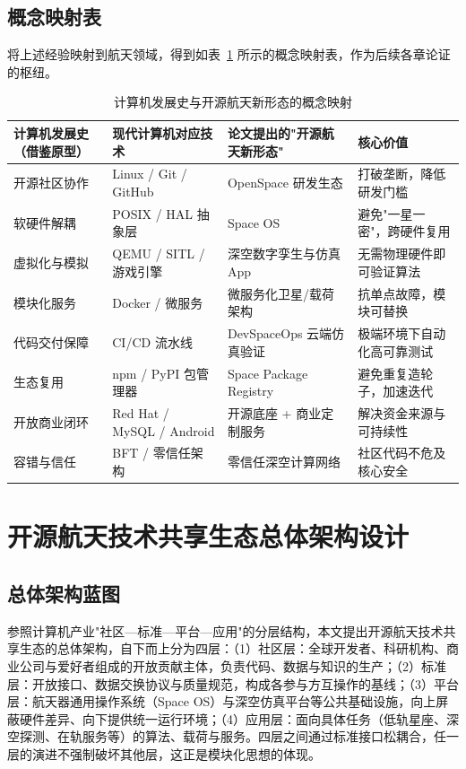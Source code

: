 \documentclass[UTF8,a4paper,zihao=-4]{ctexart}
\begin{document}
\subsection{概念映射表}
将上述经验映射到航天领域，得到如表~\ref{tab:mapping} 所示的概念映射表，作为后续各章论证的枢纽。

\begin{table}[htbp]
\centering
\footnotesize
\caption{计算机发展史与开源航天新形态的概念映射}
\label{tab:mapping}
\begin{tabularx}{\textwidth}{@{}>{\raggedright\arraybackslash}p{2.8cm}>{\raggedright\arraybackslash}p{2.8cm}>{\raggedright\arraybackslash}p{2.8cm}>{\raggedright\arraybackslash}p{2.8cm}@{}}
\toprule
计算机发展史（借鉴原型） & 现代计算机对应技术 & 论文提出的"开源航天新形态" & 核心价值 \\
\midrule
开源社区协作 & Linux / Git / GitHub & OpenSpace 研发生态 & 打破垄断，降低研发门槛 \\
软硬件解耦 & POSIX / HAL 抽象层 & Space OS & 避免"一星一密"，跨硬件复用 \\
虚拟化与模拟 & QEMU / SITL / 游戏引擎 & 深空数字孪生与仿真 App & 无需物理硬件即可验证算法 \\
模块化服务 & Docker / 微服务 & 微服务化卫星/载荷架构 & 抗单点故障，模块可替换 \\
代码交付保障 & CI/CD 流水线 & DevSpaceOps 云端仿真验证 & 极端环境下自动化高可靠测试 \\
生态复用 & npm / PyPI 包管理器 & Space Package Registry & 避免重复造轮子，加速迭代 \\
开放商业闭环 & Red Hat / MySQL / Android & 开源底座 + 商业定制服务 & 解决资金来源与可持续性 \\
容错与信任 & BFT / 零信任架构 & 零信任深空计算网络 & 社区代码不危及核心安全 \\
\bottomrule
\end{tabularx}
\end{table}

\section{开源航天技术共享生态总体架构设计}
\subsection{总体架构蓝图}
参照计算机产业"社区—标准—平台—应用"的分层结构，本文提出开源航天技术共享生态的总体架构，自下而上分为四层：（1）社区层：全球开发者、科研机构、商业公司与爱好者组成的开放贡献主体，负责代码、数据与知识的生产；（2）标准层：开放接口、数据交换协议与质量规范，构成各参与方互操作的基线；（3）平台层：航天器通用操作系统（Space OS）与深空仿真平台等公共基础设施，向上屏蔽硬件差异、向下提供统一运行环境；（4）应用层：面向具体任务（低轨星座、深空探测、在轨服务等）的算法、载荷与服务。四层之间通过标准接口松耦合，任一层的演进不强制破坏其他层，这正是模块化思想的体现。
\end{document}
